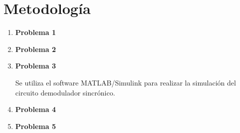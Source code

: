 \documentclass[letterpaper, titlepage]{article}
\begin{document}
\section{Metodología}
	\begin{enumerate}
		\item \textbf{Problema 1}
		
		\item \textbf{Problema 2}
		
		\item \textbf{Problema 3}
		
			Se utiliza el software MATLAB/Simulink para realizar la simulación del circuito demodulador sincrónico.
		\item \textbf{Problema 4}
		
		\item \textbf{Problema 5}
	\end{enumerate}
\newpage
\newpage
\end{document}
